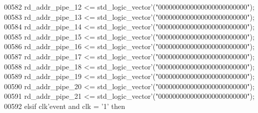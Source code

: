 \begin{DoxyCode}
00582       \textcolor{vhdlchar}{rd_addr_pipe_12} \textcolor{vhdlchar}{<=} \textcolor{comment}{std\_logic\_vector}\textcolor{vhdlchar}{'}\textcolor{vhdlchar}{(}\textcolor{vhdllogic}{"0000000000000000000000000"}\textcolor{vhdlchar}{)};
00583       \textcolor{vhdlchar}{rd_addr_pipe_13} \textcolor{vhdlchar}{<=} \textcolor{comment}{std\_logic\_vector}\textcolor{vhdlchar}{'}\textcolor{vhdlchar}{(}\textcolor{vhdllogic}{"0000000000000000000000000"}\textcolor{vhdlchar}{)};
00584       \textcolor{vhdlchar}{rd_addr_pipe_14} \textcolor{vhdlchar}{<=} \textcolor{comment}{std\_logic\_vector}\textcolor{vhdlchar}{'}\textcolor{vhdlchar}{(}\textcolor{vhdllogic}{"0000000000000000000000000"}\textcolor{vhdlchar}{)};
00585       \textcolor{vhdlchar}{rd_addr_pipe_15} \textcolor{vhdlchar}{<=} \textcolor{comment}{std\_logic\_vector}\textcolor{vhdlchar}{'}\textcolor{vhdlchar}{(}\textcolor{vhdllogic}{"0000000000000000000000000"}\textcolor{vhdlchar}{)};
00586       \textcolor{vhdlchar}{rd_addr_pipe_16} \textcolor{vhdlchar}{<=} \textcolor{comment}{std\_logic\_vector}\textcolor{vhdlchar}{'}\textcolor{vhdlchar}{(}\textcolor{vhdllogic}{"0000000000000000000000000"}\textcolor{vhdlchar}{)};
00587       \textcolor{vhdlchar}{rd_addr_pipe_17} \textcolor{vhdlchar}{<=} \textcolor{comment}{std\_logic\_vector}\textcolor{vhdlchar}{'}\textcolor{vhdlchar}{(}\textcolor{vhdllogic}{"0000000000000000000000000"}\textcolor{vhdlchar}{)};
00588       \textcolor{vhdlchar}{rd_addr_pipe_18} \textcolor{vhdlchar}{<=} \textcolor{comment}{std\_logic\_vector}\textcolor{vhdlchar}{'}\textcolor{vhdlchar}{(}\textcolor{vhdllogic}{"0000000000000000000000000"}\textcolor{vhdlchar}{)};
00589       \textcolor{vhdlchar}{rd_addr_pipe_19} \textcolor{vhdlchar}{<=} \textcolor{comment}{std\_logic\_vector}\textcolor{vhdlchar}{'}\textcolor{vhdlchar}{(}\textcolor{vhdllogic}{"0000000000000000000000000"}\textcolor{vhdlchar}{)};
00590       \textcolor{vhdlchar}{rd_addr_pipe_20} \textcolor{vhdlchar}{<=} \textcolor{comment}{std\_logic\_vector}\textcolor{vhdlchar}{'}\textcolor{vhdlchar}{(}\textcolor{vhdllogic}{"0000000000000000000000000"}\textcolor{vhdlchar}{)};
00591       \textcolor{vhdlchar}{rd_addr_pipe_21} \textcolor{vhdlchar}{<=} \textcolor{comment}{std\_logic\_vector}\textcolor{vhdlchar}{'}\textcolor{vhdlchar}{(}\textcolor{vhdllogic}{"0000000000000000000000000"}\textcolor{vhdlchar}{)};
00592     \textcolor{keywordflow}{elsif} \textcolor{vhdlchar}{clk}\textcolor{vhdlchar}{'}\textcolor{vhdlkeyword}{event} \textcolor{keywordflow}{and} \textcolor{vhdlchar}{clk} \textcolor{vhdlchar}{=} \textcolor{vhdlchar}{'}\textcolor{vhdllogic}{}\textcolor{vhdllogic}{1}\textcolor{vhdlchar}{'} \textcolor{keywordflow}{then}

\end{DoxyCode}
